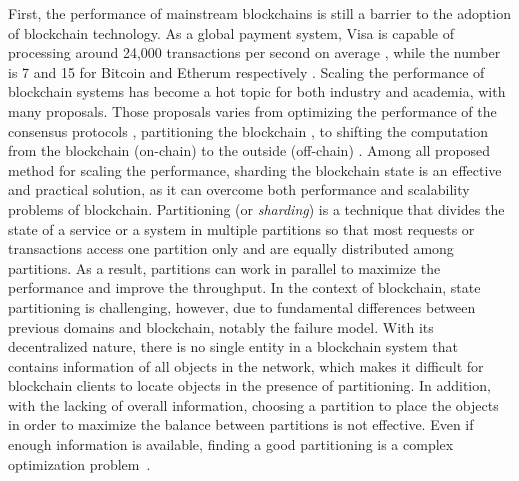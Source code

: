 First, the performance of mainstream blockchains is still a barrier to the
adoption of blockchain technology. As a global payment system, Visa is capable
of processing around 24,000 transactions per second on average \cite{visa},
while the number is 7 and 15 for Bitcoin and Etherum respectively
\cite{ethereum:sharding, nakamoto2019bitcoin}. Scaling the performance of
blockchain systems has become a hot topic for both industry and academia, with
many proposals. Those proposals varies from optimizing the performance of the
consensus protocols \cite{dang2019towards}, partitioning the blockchain
\cite{wang2019sok}, to shifting the computation from the blockchain (on-chain) to
the outside (off-chain) \cite{teutsch2019scalable, network2018cheap}. Among all
proposed method for scaling the performance, sharding the blockchain state is an
effective and practical solution, as it can overcome both performance and
scalability problems of blockchain. Partitioning (or \emph{sharding}) is a
technique that divides the state of a service or a system in multiple partitions
so that most requests or transactions access one partition only and are equally
distributed among partitions. As a result, partitions can work in parallel to
maximize the performance and improve the throughput. In the context of
blockchain, state partitioning is challenging, however, due to fundamental
differences between previous domains and blockchain, notably the failure model.
With its decentralized nature, there is no single entity in a blockchain system
that contains information of all objects in the network, which makes it
difficult for blockchain clients to locate objects in the presence of
partitioning. In addition, with the lacking of overall information, choosing a
partition to place the objects in order to maximize the balance between
partitions is not effective. Even if enough information is available, finding a
good partitioning is a complex optimization problem~\cite{curino2010sch,taft2014est}. 

